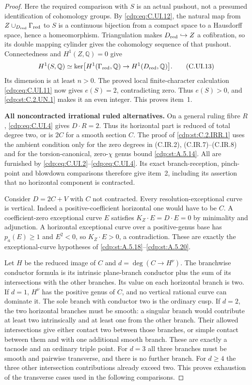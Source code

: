 \begin{proof}
Here the required comparison with $S$ is an
actual pushout, not a presumed identification
of cohomology groups. By \eqref{cdp:eq:C.UI.12}, the natural
map from
$Z\cup_{D_{\rm red}}\Gamma_{\rm red}$ to $S$
is a continuous bijection from a compact space
to a Hausdorff space, hence a homeomorphism.
Triangulation makes $D_{\rm red}\hookrightarrow Z$
a cofibration, so its double mapping cylinder
gives the cohomology sequence of that pushout.
Connectedness and $H^1(Z,\mathbb Q)=0$ give
\[
 H^1(S,\mathbb Q)
  \simeq\ker\bigl[H^1(\Gamma_{\rm red},\mathbb Q)
                       \to H^1(D_{\rm red},\mathbb Q)\bigr].
 \tag{C.UI.13}\label{cdp:eq:C.UI.13}
\]
Its dimension is at least $n>0$. The proved
local finite-character calculation \eqref{cdp:eq:C.UI.11}
now gives $e(S)=2$, contradicting zero.
Thus $e(S)>0$, and \ref{cdp:st:C.2.UN.1} makes it an even
integer. This proves item~1.

\par\medskip\noindent\textbf{All noncontracted irrational ruled alternatives.}\quad
On a general ruling fibre $R$, \eqref{cdp:eq:C.UI.4} gives
$D\cdot R=2$. Thus its horizontal part is reduced
of total degree two, or is $2C$ for a smooth
section $C$. The proof of \ref{cdp:st:C.2.IRR.1} uses the
ambient condition only for the zero degrees
in (C.IR.2), (C.IR.7)--(C.IR.8) and for the
torsion-canonical, zero-$\chi$ genus bound \ref{cdp:st:A.5.14}.
All are furnished by \eqref{cdp:eq:C.UI.2}--\eqref{cdp:eq:C.UI.4}.
Its exact branch-reception, pinch-point and
blowdown comparisons therefore give item~2,
including its assertion that no horizontal
component is contracted.

Consider $D=2C+V$ with $C$ not contracted.
Every resolution-exceptional curve is vertical.
Indeed a positive-coefficient horizontal one
would have to be $C$. A coefficient-zero
exceptional curve $E$ satisfies
$K_Z\cdot E=D\cdot E=0$ by minimality and
adjunction. A horizontal exceptional curve over
a positive-genus base has $p_a(E)\ge1$ and
$E^2<0$, so $K_Z\cdot E>0$, a contradiction.
These are exactly the exceptional-curve
hypotheses of \ref{cdp:st:A.5.18}--\ref{cdp:st:A.5.20}.

Let $H$ be the reduced image of $C$ and
$d=\deg(C\to H^\nu)$. The branchwise conductor
formula is its intrinsic plane-branch conductor
plus the sum of its intersections with the
other branches. Its value on each horizontal
branch is two. If $d=1$, $H^\nu$ has the
positive genus of $C$, and no vertical rational
curve can dominate it. The sole branch with
conductor two is the ordinary cusp. If $d=2$,
the two horizontal branches must be smooth:
a singular branch would contribute at least two
intrinsically and at least one from the other
branch. Their allowed intersections give either
contact two between those branches, or simple
contact between them and with one additional
smooth branch. These are exactly a tacnode and
an ordinary triple point. For $d=3$ all three
branches must be smooth and pairwise transverse,
and there is no further branch. For $d\ge4$
the three other intersection contributions
already exceed two. This proves exhaustion
of the transverse cases used in the following
comparisons.


\end{proof}
